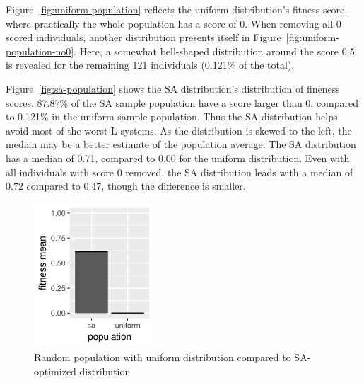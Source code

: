 Figure~\ref{fig:uniform-population} reflects the uniform distribution's fitness score, where practically the whole population has a score of 0.
When removing all 0-scored individuals, another distribution presents itself in Figure~\ref{fig:uniform-population-no0}.
Here, a somewhat bell-shaped distribution around the score 0.5 is revealed for the remaining 121 individuals (0.121\% of the total).

Figure~\ref{fig:sa-population} shows the SA distribution's distribution of fineness scores.
87.87\% of the SA sample population have a score larger than 0, compared to 0.121\% in the uniform sample population.
Thus the SA distribution helps avoid most of the worst L-systems.
As the distribution is skewed to the left, the median may be a better estimate of the population average.
The SA distribution has a median of 0.71, compared to 0.00 for the uniform distribution.
Even with all individuals with score 0 removed, the SA distribution leads with a median of 0.72 compared to 0.47, though the difference is smaller.

\begin{figure}
    \centering
    \includegraphics[width=0.4\textwidth]{figures/sa-uniform}
    \caption{Random population with uniform distribution compared to SA-optimized distribution}
    \label{fig:sa-uniform}
\end{figure}

